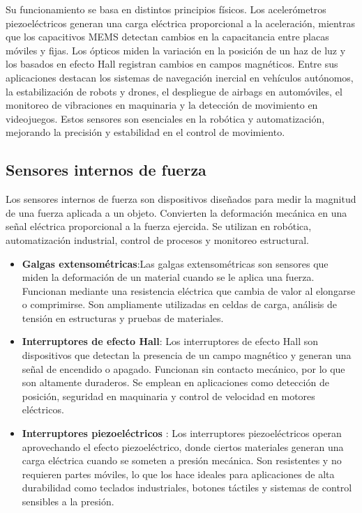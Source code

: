 Su funcionamiento se basa en distintos principios físicos. Los acelerómetros piezoeléctricos generan una carga eléctrica proporcional a la aceleración, mientras que los capacitivos MEMS detectan cambios en la capacitancia entre placas móviles y fijas. Los ópticos miden la variación en la posición de un haz de luz y los basados en efecto Hall registran cambios en campos magnéticos.
Entre sus aplicaciones destacan los sistemas de navegación inercial en vehículos autónomos, la estabilización de robots y drones, el despliegue de airbags en automóviles, el monitoreo de vibraciones en maquinaria y la detección de movimiento en videojuegos. Estos sensores son esenciales en la robótica y automatización, mejorando la precisión y estabilidad en el control de movimiento.

\subsection{Sensores internos de fuerza}
Los sensores internos de fuerza son dispositivos diseñados para medir la magnitud de una fuerza aplicada a un objeto. Convierten la deformación mecánica en una señal eléctrica proporcional a la fuerza ejercida. Se utilizan en robótica, automatización industrial, control de procesos y monitoreo estructural.
\begin{itemize}
	\item \textbf{Galgas extensométricas}:Las galgas extensométricas son sensores que miden la deformación de un material cuando se le aplica una fuerza. Funcionan mediante una resistencia eléctrica que cambia de valor al elongarse o comprimirse. Son ampliamente utilizadas en celdas de carga, análisis de tensión en estructuras y pruebas de materiales.

	\item \textbf{Interruptores de efecto Hall}: Los interruptores de efecto Hall son dispositivos que detectan la presencia de un campo magnético y generan una señal de encendido o apagado. Funcionan sin contacto mecánico, por lo que son altamente duraderos. Se emplean en aplicaciones como detección de posición, seguridad en maquinaria y control de velocidad en motores eléctricos.

	\item \textbf{Interruptores piezoeléctricos }: Los interruptores piezoeléctricos operan aprovechando el efecto piezoeléctrico, donde ciertos materiales generan una carga eléctrica cuando se someten a presión mecánica. Son resistentes y no requieren partes móviles, lo que los hace ideales para aplicaciones de alta durabilidad como teclados industriales, botones táctiles y sistemas de control sensibles a la presión.
\newpage
\end{itemize}